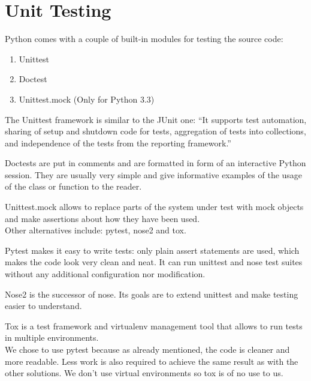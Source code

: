 \section{Unit Testing}

Python comes with a couple of built-in modules for testing the source code:

\begin{enumerate}
    \item Unittest
    \item Doctest
    \item Unittest.mock (Only for Python 3.3)
\end{enumerate}

The Unittest framework is similar to the JUnit one: ``It supports test
automation, sharing of setup and shutdown code for tests, aggregation of tests
into collections, and independence of the tests from the reporting
framework.''~\cite{pythondoc361unittest}

Doctests are put in comments and are formatted in form of an interactive Python
session. They are usually very simple and give informative examples of the usage
of the class or function to the reader.~\cite{python361doctest}

Unittest.mock allows to replace parts of the system under test with mock objects
and make assertions about how they have been used.~\cite{pythondoc370mock}
\\

Other alternatives include: pytest, nose2 and tox.

Pytest makes it easy to write tests: only plain assert statements are used,
which makes the code look very clean and neat. It can run unittest and nose test
suites without any additional configuration nor modification.~\cite{pytest}

Nose2 is the successor of nose. Its goals are to extend unittest and make
testing easier to understand.~\cite{nose2VSnose}

Tox is a test framework and virtualenv management tool that allows to run tests
in multiple environments.~\cite{tox270doc}\\

We chose to use pytest because as already mentioned, the code is cleaner and
more readable. Less work is also required to achieve the same result as with the
other solutions. We don't use virtual environments so tox is of no use to us.
